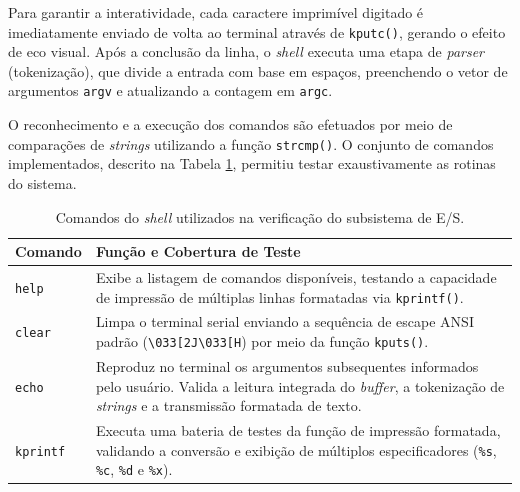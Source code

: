 Para garantir a interatividade, cada caractere imprimível digitado é imediatamente enviado de volta ao terminal através de \texttt{kputc()}, gerando o efeito de eco visual. Após a conclusão da linha, o \textit{shell} executa uma etapa de \textit{parser} (tokenização), que divide a entrada com base em espaços, preenchendo o vetor de argumentos \texttt{argv} e atualizando a contagem em \texttt{argc}.

O reconhecimento e a execução dos comandos são efetuados por meio de comparações de \textit{strings} utilizando a função \texttt{strcmp()}. O conjunto de comandos implementados, descrito na Tabela \ref{tab:shell-comandos}, permitiu testar exaustivamente as rotinas do sistema.

\begin{table}[htbp]
    \centering
    \renewcommand{\arraystretch}{1.3}
    \begin{tabular}{@{}lp{9cm}@{}}
        \hline
        \textbf{Comando} & \textbf{Função e Cobertura de Teste} \\
        \hline
        \texttt{help} & Exibe a listagem de comandos disponíveis, testando a capacidade de impressão de múltiplas linhas formatadas via \texttt{kprintf()}. \\
        \texttt{clear} & Limpa o terminal serial enviando a sequência de escape ANSI padrão (\texttt{\textbackslash033[2J\textbackslash033[H}) por meio da função \texttt{kputs()}. \\
        \texttt{echo} & Reproduz no terminal os argumentos subsequentes informados pelo usuário. Valida a leitura integrada do \textit{buffer}, a tokenização de \textit{strings} e a transmissão formatada de texto. \\
        \texttt{kprintf} & Executa uma bateria de testes da função de impressão formatada, validando a conversão e exibição de múltiplos especificadores (\texttt{\%s}, \texttt{\%c}, \texttt{\%d} e \texttt{\%x}). \\
        \hline
    \end{tabular}
    \caption{Comandos do \textit{shell} utilizados na verificação do subsistema de E/S.}
    \label{tab:shell-comandos}
\end{table}
